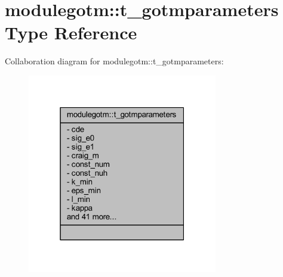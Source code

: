 \hypertarget{structmodulegotm_1_1t__gotmparameters}{}\section{modulegotm\+:\+:t\+\_\+gotmparameters Type Reference}
\label{structmodulegotm_1_1t__gotmparameters}


Collaboration diagram for modulegotm\+:\+:t\+\_\+gotmparameters\+:\nopagebreak
\begin{figure}[H]
\begin{center}
\leavevmode
\includegraphics[width=235pt]{structmodulegotm_1_1t__gotmparameters__coll__graph}
\end{center}
\end{figure}
